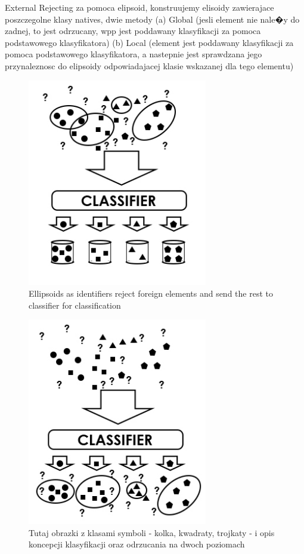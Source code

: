 \documentclass{llncs}
\begin{document}
{\color{red}External Rejecting za pomoca elipsoid, konstruujemy elisoidy zawierajace poszczegolne klasy natives, dwie metody (a) Global (jesli element nie nale�y do zadnej, to jest odrzucany, wpp jest poddawany klasyfikacji za pomoca podstawowego klasyfikatora) (b) Local (element jest poddawany klasyfikacji za pomoca podstawowego klasyfikatora, a nastepnie jest sprawdzana jego przynaleznosc do elipsoidy odpowiadajacej klasie wskazanej dla tego elementu)}


\begin{figure}[!h]
  \centering
  \includegraphics[width=0.7\textwidth]{_Figures/Classification1.jpg}
  \caption{Ellipsoids as identifiers reject foreign elements and send the rest to classifier for classification}
\label{fig:nativeforeignpatternsClassification}
\end{figure}

\begin{figure}[!h]
	\centering
	\includegraphics[width=0.7\textwidth]{_Figures/Classification2.jpg}
	\caption{\color{red}Tutaj obrazki z klasami symboli - kolka, kwadraty, trojkaty - i opis koncepcji klasyfikacji oraz odrzucania na dwoch poziomach}
	\label{fig:nativeforeignpatternsClassification}
\end{figure}
\end{document}
